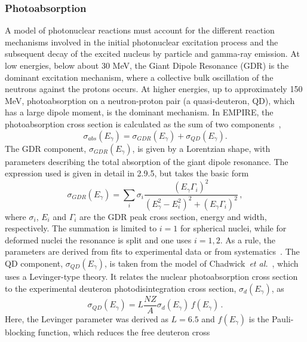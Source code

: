 \documentclass[twocolumn,amsmath,amssymb,10pt,groupedaddress,a4paper]{revtex4}
\begin{document}
\subsubsection{Photoabsorption}
A model of photonuclear reactions must account for the different reaction
mechanisms involved in the initial photonuclear excitation process
and the subsequent decay of the excited nucleus by particle and gamma-ray
emission. At low energies, below about 30 MeV, the Giant Dipole Resonance
(GDR) is the dominant excitation mechanism, where a collective bulk
oscillation of the neutrons against the protons occurs. At higher
energies, up to approximately 150 MeV, photoabsorption on a neutron-proton
pair (a quasi-deuteron, QD), which has a large dipole moment, is the
dominant mechanism.
In EMPIRE, the photoabsorption cross section is calculated as the
sum of two components~\cite{PHNuc},
\begin{equation}
\sigma_{abs}(E_{\gamma})=\sigma_{GDR}(E_{\gamma})+\sigma_{QD}(E_{\gamma}).
\end{equation}
The GDR component, $\sigma_{GDR}(E_{\gamma})$, is given by a Lorentzian
shape, with parameters describing the total absorption of the giant
dipole resonance. The expression used is given in detail in 2.9.5,
but takes the basic form
\begin{equation}
\sigma_{GDR}(E_{\gamma})=\sum_{i}\sigma_{i}\frac{(E_{\gamma}\Gamma_{i})^{2}}{(E_{\gamma}^{2}-E_{i}^{2})^{2}+(E_{\gamma}\Gamma_{i})^{2}}\,,
\end{equation}
\noindent where $\sigma_{i}$, $E_{i}$ and $\Gamma_{i}$ are the GDR peak cross
section, energy and width, respectively. The summation is limited
to $i=1$ for spherical nuclei, while for deformed nuclei the resonance
is split and one uses $i=1,2$. As a rule, the parameters are derived
from fits to experimental data or from systematics~\cite{RIPL2}.
The QD component, $\sigma_{QD}(E_{\gamma})$, is taken from the model
of Chadwick~\emph{et al.}~\cite{chadQD}, which uses a Levinger-type
theory. It relates the nuclear photoabsorption cross section to the
experimental deuteron photodisintegration cross section, $\sigma_{d}(E_{\gamma})$,
as
\begin{equation}
\sigma_{QD}(E_{\gamma})=L\frac{NZ}{A}\sigma_{d}(E_{\gamma})\, f(E_{\gamma})\,.
\end{equation}
Here, the Levinger parameter was derived as $L=6.5$ and $f(E_{\gamma})$
is the Pauli-blocking function, which reduces the free deuteron cross
\end{document}
